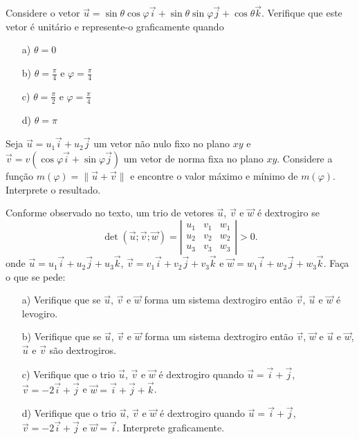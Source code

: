 \begin{exer} Considere o vetor $\vec{u}=\sin\theta \cos\varphi \vec{i}+ \sin\theta \sin\varphi \vec{j} + \cos\theta \vec{k}$. Verifique que este vetor é unitário e represente-o graficamente quando
\begin{itemize}
\item[a)] $\theta=0$
\item[b)] $\theta=\frac{\pi}{4}$ e $\varphi=\frac{\pi}{4}$
\item[c)] $\theta=\frac{\pi}{2}$ e $\varphi=\frac{\pi}{4}$
\item[d)] $\theta=\pi$

\end{itemize}
\end{exer}

\begin{exer}\label{probmaxmin} Seja $\vec{u}=u_1\vec{i} + u_2\vec{j}$ um vetor não nulo fixo no plano $xy$ e $\vec{v}=v\left(\cos\varphi \vec{i}+\sin\varphi \vec{j}\right)$ um vetor de norma fixa no plano $xy$. Considere a função $m(\varphi)=\|\vec{u}+\vec{v}\|$ e encontre o valor máximo e mínimo de $m(\varphi)$. Interprete o resultado.
\end{exer}

\begin{exer}\label{probdextro} Conforme observado no texto, um trio de vetores $\vec{u}$, $\vec{v}$ e $\vec{w}$ é dextrogiro se
\begin{equation*}
\det\left(\vec{u};\vec{v};\vec{w}\right)= \left|\begin{array}{ccc}
u_1&v_1&w_1\\
u_2&v_2&w_2\\
u_3&v_3&w_3
\end{array}
\right|>0.
\end{equation*}
onde $\vec{u}=u_1\vec{i}+u_2\vec{j}+u_3\vec{k}$, $\vec{v}=v_1\vec{i}+v_2\vec{j}+v_3\vec{k}$ e $\vec{w}=w_1\vec{i}+w_2\vec{j}+w_3\vec{k}$. Faça o que se pede:
\begin{itemize}
\item [a)]Verifique que se $\vec{u}$, $\vec{v}$ e $\vec{w}$ forma um sistema dextrogiro então $\vec{v}$, $\vec{u}$ e $\vec{w}$ é levogiro.
\item [b)]Verifique que se $\vec{u}$, $\vec{v}$ e $\vec{w}$ forma um sistema dextrogiro então $\vec{v}$, $\vec{w}$ e $\vec{u}$ e $\vec{w}$, $\vec{u}$ e $\vec{v}$ são dextrogiros.
\item [c)]Verifique que o trio $\vec{u}$, $\vec{v}$ e $\vec{w}$ é dextrogiro quando $\vec{u}=\vec{i}+\vec{j}$, $\vec{v}=-2\vec{i}+\vec{j}$ e $\vec{w}=\vec{i}+\vec{j}+\vec{k}$.
\item [d)]Verifique que o trio $\vec{u}$, $\vec{v}$ e $\vec{w}$ é dextrogiro quando $\vec{u}=\vec{i}+\vec{j}$, $\vec{v}=-2\vec{i}+\vec{j}$ e $\vec{w}=\vec{i}$. Interprete graficamente.
\end{itemize}
\end{exer}


